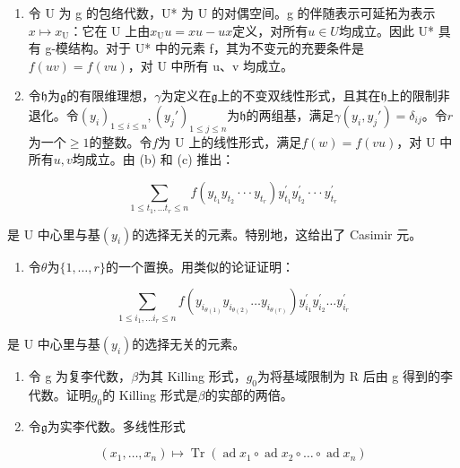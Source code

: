 \begin{enumerate}
\def\labelenumi{(\alph{enumi})}
\setcounter{enumi}{2}
\item
  令 U 为 g 的包络代数，U* 为 U 的对偶空间。g 的伴随表示可延拓为表示\(x \mapsto x_{\mathrm{U}}\)：它在 U 上由\(x_{\mathrm{U}}u = xu - ux\)定义，对所有\(u \in U\)均成立。因此 U* 具有 g-模结构。对于 U* 中的元素 f，其为不变元的充要条件是\(f(uv) = f(vu)\)，对 U 中所有 u、v 均成立。
\item
  令\(\mathfrak{h}\)为\(\mathfrak{g}\)的有限维理想，\(\gamma\)为定义在\(\mathfrak{g}\)上的不变双线性形式，且其在\(\mathfrak{h}\)上的限制非退化。令\((y_i)_{1\leq i\leq n}, (y_j')_{1\leq j\leq n}\)为\(\mathfrak{h}\)的两组基，满足\(\gamma(y_i,y_j') = \delta_{ij}\)。令\(r\)为一个\(\geqslant 1\)的整数。令\(f\)为 U 上的线性形式，满足\(f(w) = f(vu)\)，对 U 中所有\(u,v\)均成立。由 (b) 和 (c) 推出：
\end{enumerate}

\[
\sum_ {1 \leqslant t _ {1}, \dots t _ {r} \leqslant n} f (y _ {t _ {1}} y _ {t _ {2}} \cdot \cdot \cdot y _ {t _ {r}}) y _ {t _ {1}} ^ {\prime} y _ {t _ {2}} ^ {\prime} \cdot \cdot \cdot y _ {t _ {r}} ^ {\prime}
\]

是 U 中心里与基\((y_{i})\)的选择无关的元素。特别地，这给出了 Casimir 元。

\begin{enumerate}
\def\labelenumi{(\alph{enumi})}
\setcounter{enumi}{4}
\tightlist
\item
  令\(\theta\)为\(\{1, \ldots, r\}\)的一个置换。用类似的论证证明：
\end{enumerate}

\[
\sum_ {1 \leqslant i _ {1}, \dots i _ {r} \leqslant n} f (y _ {i _ {\theta (1)}} y _ {i _ {\theta (2)}} \dots y _ {i _ {\theta (r)}}) y _ {i _ {1}} ^ {\prime} y _ {i _ {2}} ^ {\prime} \dots y _ {i _ {r}} ^ {\prime}
\]

是 U 中心里与基\((y_{i})\)的选择无关的元素。

\begin{enumerate}
\def\labelenumi{\arabic{enumi}.}
\setcounter{enumi}{6}
\item
  令 g 为复李代数，\(\beta\)为其 Killing 形式，\(g_{0}\)为将基域限制为 R 后由 g 得到的李代数。证明\(g_{0}\)的 Killing 形式是\(\beta\)的实部的两倍。
\item
  令\(\mathfrak{g}\)为实李代数。多线性形式
\end{enumerate}

\[
(x _ {1}, \dots , x _ {n}) \mapsto \operatorname{Tr} (\operatorname{ad} x _ {1} \circ \operatorname{ad} x _ {2} \circ \dots \circ \operatorname{ad} x _ {n})
\]

